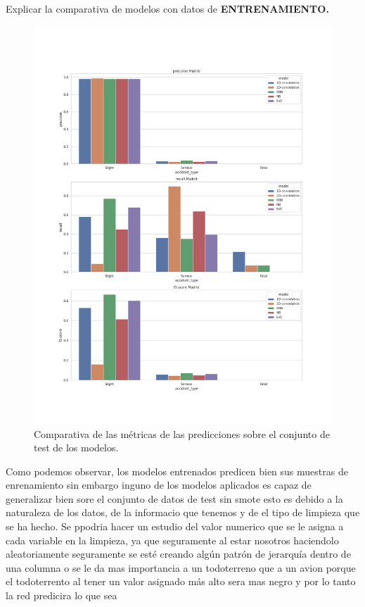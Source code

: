    Explicar la comparativa de modelos con datos de \textbf{ENTRENAMIENTO.}


    \begin{figure}[h]
        \centering
        \includegraphics[width=16cm]{archivos/5.Resultados/ComparativaTest}
        \caption{Comparativa de las métricas de las predicciones sobre el conjunto de test de los modelos.}
        \label{ResultsTestImage}
     \end{figure}



Como podemos observar, los modelos entrenados predicen bien sus muestras de enrenamiento sin embargo inguno de los modelos aplicados es capaz de generalizar bien sore el conjunto de datos de test sin smote
esto es debido a la naturaleza de los datos, de la informacio que tenemos y de el tipo de limpieza que se ha hecho. Se ppodria hacer un estudio del valor numerico que se le asigna a cada variable en la limpieza, ya que seguramente al estar nosotros haciendolo aleatoriamente seguramente se esté creando algún patrón de jerarquía dentro de una columna o se le da mas importancia a un todoterreno que a un avion porque el todoterrento al tener un valor asignado más alto sera mas negro y por lo tanto la red predicira lo que sea